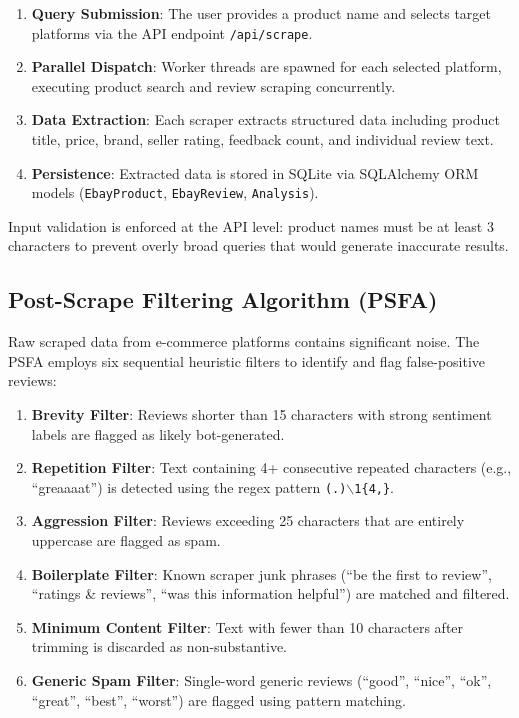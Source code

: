 \documentclass[conference]{IEEEtran}
\begin{document}
\begin{enumerate}
    \item \textbf{Query Submission}: The user provides a product name and selects target platforms via the API endpoint \texttt{/api/scrape}.
    \item \textbf{Parallel Dispatch}: Worker threads are spawned for each selected platform, executing product search and review scraping concurrently.
    \item \textbf{Data Extraction}: Each scraper extracts structured data including product title, price, brand, seller rating, feedback count, and individual review text.
    \item \textbf{Persistence}: Extracted data is stored in SQLite via SQLAlchemy ORM models (\texttt{EbayProduct}, \texttt{EbayReview}, \texttt{Analysis}).
\end{enumerate}

Input validation is enforced at the API level: product names must be at least 3 characters to prevent overly broad queries that would generate inaccurate results.

\subsection{Post-Scrape Filtering Algorithm (PSFA)}

Raw scraped data from e-commerce platforms contains significant noise. The PSFA employs six sequential heuristic filters to identify and flag false-positive reviews:

\begin{enumerate}
    \item \textbf{Brevity Filter}: Reviews shorter than 15 characters with strong sentiment labels are flagged as likely bot-generated.
    \item \textbf{Repetition Filter}: Text containing 4+ consecutive repeated characters (e.g., ``greaaaat'') is detected using the regex pattern \texttt{(.)$\backslash$1\{4,\}}.
    \item \textbf{Aggression Filter}: Reviews exceeding 25 characters that are entirely uppercase are flagged as spam.
    \item \textbf{Boilerplate Filter}: Known scraper junk phrases (``be the first to review'', ``ratings \& reviews'', ``was this information helpful'') are matched and filtered.
    \item \textbf{Minimum Content Filter}: Text with fewer than 10 characters after trimming is discarded as non-substantive.
    \item \textbf{Generic Spam Filter}: Single-word generic reviews (``good'', ``nice'', ``ok'', ``great'', ``best'', ``worst'') are flagged using pattern matching.
\end{enumerate}
\end{document}
